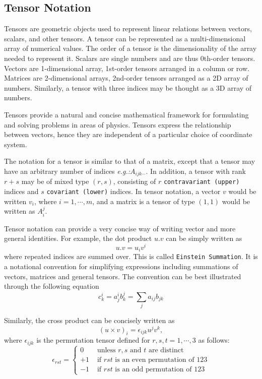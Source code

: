 \subsection{Tensor Notation}
Tensors are geometric objects used to represent linear relations between vectors, scalars, and other tensors. A tensor can be represented as a multi-dimensional array of numerical values. The order of a tensor is the dimensionality of the array needed to represent it. Scalars are single numbers and are thus 0th-order tensors. Vectors are 1-dimensional array, 1st-order tensors arranged in a column or row. Matrices are 2-dimensional arrays, 2nd-order tensors arranged as a 2D array of numbers. Similarly, a tensor with three indices may be thought as a 3D array of numbers.

Tensors provide a natural and concise mathematical framework for formulating and solving problems in areas of physics. Tensors express the relationship between vectors, hence they are independent of a particular choice of coordinate system.

The notation for a tensor is similar to that of a matrix, except that a tensor may have an arbitrary number of indices \textit{e.g.:}$A_{ijk\dotsb}$. In addition, a tensor with rank $r+s$ may be of mixed type $(r,s)$, consisting of $r$ \texttt{contravariant (upper)} indices and $s$ \texttt{covariant (lower)} indices. In tensor notation, a vector $v$ would be written $v_i$, where $i =1,\dotsb,m$, and a matrix is a tensor of type $(1,1)$ would be written as $A^{j}_{i}$.

Tensor notation can provide a very concise way of writing vector and more general identities. For example, the dot product $u.v$ can be simply written as
$$
u.v = u_{i}v^{i}
$$
where repeated indices are summed over. This is called \texttt{Einstein Summation}. It is a notational convention for simplifying expressions including summations of vectors, matrices and general tensors. The convention can be best illustrated through the following equation
$$
  c^{i}_{k} = a^{i}_{j}b^{j}_{k} = \sum_{j} a_{ij}b_{jk}
$$

Similarly, the cross product can be concisely written as
$$
  (u\times v)_{i} = \epsilon_{ijk} u^{j} v^{k},
$$
where $\epsilon_{ijk}$ is the permutation tensor defined for $r,s,t =1,\dotsb,3$ as follows:
$$
\epsilon_{rst} = \begin{cases}
  0 & \text{ unless } r,s \text{ and } t \text{ are distinct}\\
  +1 & \text{ if } rst \text{ is an even permutation of } 123\\
  -1 & \text{ if } rst \text{ is an odd permutation of } 123
\end{cases}
$$
